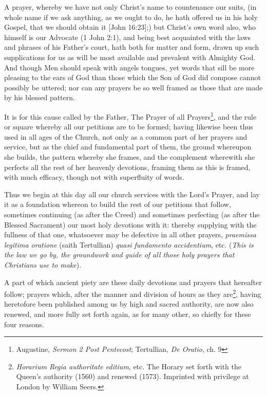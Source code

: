 \documentclass{article}
\begin{document}
A prayer, whereby we have not only Christ's name to countenance our suits,
(in whole name if we ask anything, as we ought to do, he hath offered us in his
holy Gospel, that we should obtain it [John 16:23];) but Christ's
own word also, who himself is our Advocate (1 John 2:1), and being best
acquainted with the laws and phrases of his Father's court, hath both
for matter and form,
drawn up such supplications for us as will be most available and prevalent
with Almighty God. And though Men should speak with angels tongues, yet words
that sill be more pleasing to the ears of God than those which the Son of God
did compose cannot possibly be uttered; nor can any prayers be so
well framed as those that
are made by his blessed pattern.

It is for this cause called by the Father, The Prayer of all
Prayers\footnote{Augustine, \textit{Sermon 2 Post Pentecost};
Tertullian, \textit{De Oratio}, ch. 9}, and the rule or square
whereby all our petitions are to be formed; having likewise been
thus used in all ages of the Church, not only as a common part
of her prayers and service, but as the chief and fundamental part of them,
the ground whereupon she builds, the pattern whereby she frames,
and the complement wherewith she perfects all the rest of her
heavenly devotions,
framing them as this is framed, with much efficacy, though not with superfluity
of words.

Thus we begin at this day all our church services with the Lord's Prayer,
and lay it as a foundation whereon to build the rest of our petitions
that follow, sometimes continuing (as after the Creed) and sometimes perfecting
(as after the Blessed Sacrament) our most holy devotions with it:
thereby supplying with the fullness of that one, whatsoever may be
defective in all other
prayers, \textit{praemissa legitima oratione} (saith Tertullian)
\textit{quasi fundamento accidentium}, etc. (\textit{This is the law
    we go by, the groundwork and guide of all those holy prayers that
Christians use to make}).

A part of which ancient piety are these daily devotions and prayers
that hereafter follow;
prayers which, after the manner and division of
hours as they are\footnote{\textit{Horarium Regia authoritate editium}, etc. The
  Horary set forth with the Queen's authority (1560) and renewed
(1573). Imprinted with privilege at London by William Seers.},
having heretofore been published among us by high and sacred authority, are now
also renewed, and more fully set forth again, as for many other, so
chiefly for these
four reasons.
\end{document}
